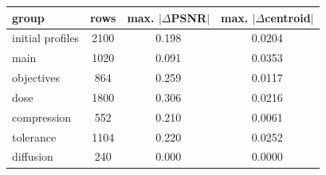 \begin{tabular}{@{}lccc@{}}\toprule
group & rows & max. $|\Delta$PSNR$|$ & max. $|\Delta$centroid$|$\\\midrule
initial profiles & 2100 & 0.198 & 0.0204\\
main & 1020 & 0.091 & 0.0353\\
objectives & 864 & 0.259 & 0.0117\\
dose & 1800 & 0.306 & 0.0216\\
compression & 552 & 0.210 & 0.0061\\
tolerance & 1104 & 0.220 & 0.0252\\
diffusion & 240 & 0.000 & 0.0000\\
\bottomrule\end{tabular}
